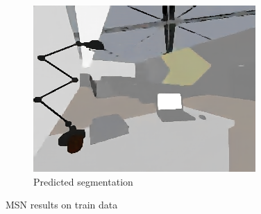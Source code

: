 \begin{figure}[H]
\begin{subfigure}{0.32\linewidth}
        \includegraphics[width=\linewidth]{praca/images/AI53_007_Cam08.predicted_segmentation.png}
        \caption{Predicted segmentation}
    \end{subfigure}
    \caption[MSN results - train data]{MSN results on train data}
    \label{fig:msn-train}
\end{figure}

